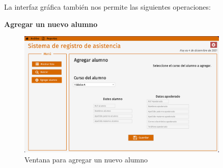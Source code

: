 
La interfaz gráfica también nos permite las siguientes operaciones:

\textbf{Agregar un nuevo alumno}

\clearpage

\begin{figure}[h]
    \centering
    \includegraphics[width=0.9\textwidth]{contents/img/gui/img8}
    \caption{Ventana para agregar un nuevo alumno}
    \label{fig:gui8}
\end{figure}

